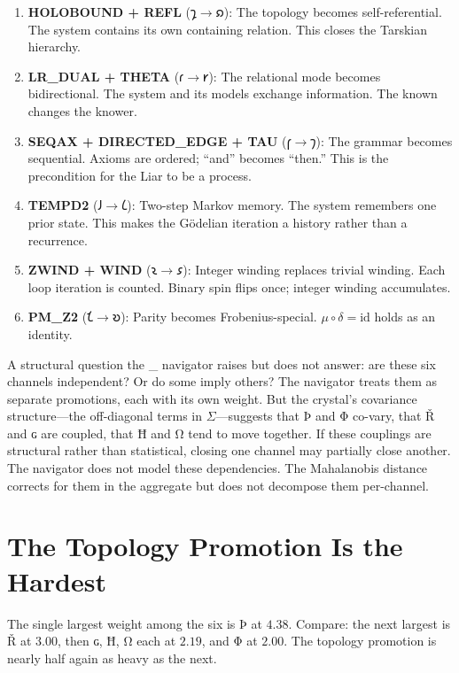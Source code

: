 \documentclass[12pt,twoside]{book}
\theoremstyle{definition}
\newcommand{\ZFCt}{\text{ZFC}_{\tau}}
\newcommand{\moebius}{\mu \circ \delta = \mathrm{id}}
\begin{document}
\begin{enumerate}
\item \textbf{HOLOBOUND + REFL} ($𐑡 \to 𐑸$): The topology becomes
  self-referential. The system contains its own containing relation. This closes the
  Tarskian hierarchy.

\item \textbf{LR\_DUAL + THETA} ($𐑩 \to 𐑾$): The relational mode becomes
  bidirectional. The system and its models exchange information. The known changes the
  knower.

\item \textbf{SEQAX + DIRECTED\_EDGE + TAU} ($𐑝 \to 𐑠$): The grammar
  becomes sequential. Axioms are ordered; ``and'' becomes ``then.'' This is the
  precondition for the Liar to be a process.

\item \textbf{TEMPD2} ($𐑓 \to 𐑖$): Two-step Markov memory. The system
  remembers one prior state. This makes the G\"{o}delian iteration a history rather than a
  recurrence.

\item \textbf{ZWIND + WIND} ($𐑷 \to 𐑭$): Integer winding replaces trivial
  winding. Each loop iteration is counted. Binary spin flips once; integer winding
  accumulates.

\item \textbf{PM\_Z2} ($𐑗 \to 𐑹$): Parity becomes Frobenius-special.
  $\moebius$ holds as an identity.
\end{enumerate}

A structural question the \ZFCt{} navigator raises but does not answer: are these six
channels independent? Or do some imply others? The navigator treats them as separate
promotions, each with its own weight. But the crystal's covariance structure---the
off-diagonal terms in $\Sigma$---suggests that Þ and Φ co-vary, that Ř and ɢ are coupled,
that Ħ and Ω tend to move together. If these couplings are structural rather than
statistical, closing one channel may partially close another. The navigator does not model
these dependencies. The Mahalanobis distance corrects for them in the aggregate but does
not decompose them per-channel.

\section{The Topology Promotion Is the Hardest}

The single largest weight among the six is Þ at $4.38$. Compare: the next largest is Ř at
$3.00$, then ɢ, Ħ, Ω each at $2.19$, and Φ at $2.00$. The topology promotion is nearly
half again as heavy as the next.
\end{document}
